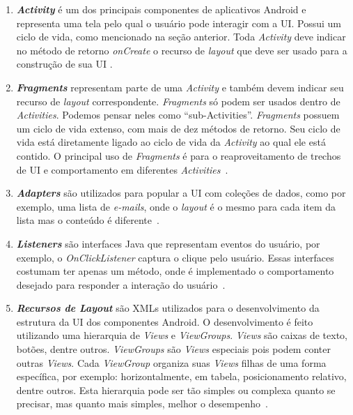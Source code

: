 \begin{enumerate}
  \item \textbf{\textit{Activity}} é um dos principais componentes de aplicativos Android e representa uma tela pelo qual o usuário pode interagir com a \acs{UI}. Possui um ciclo de vida, como mencionado na seção anterior. Toda \textit{Activity} deve indicar no método de retorno \textit{onCreate} o recurso de \textit{layout} que deve ser usado para a construção de sua \acs{UI} \cite{AndroidActivities2016, AndroidDevActivityReference}.

  \item \textbf{\textit{Fragments}} representam parte de uma \textit{Activity} e também devem indicar seu recurso de \textit{layout} correspondente. \textit{Fragments} só podem ser usados dentro de \textit{Activities}. Podemos pensar neles como ``sub-Activities''. \textit{Fragments} possuem um ciclo de vida extenso, com mais de dez métodos de retorno. Seu ciclo de vida está diretamente ligado ao ciclo de vida da \textit{Activity} ao qual ele está contido. O principal uso de \textit{Fragments} é para o reaproveitamento de trechos de \acs{UI} e comportamento em diferentes \textit{Activities}~\cite{AndroidFragments}.

  \item \textbf{\textit{Adapters}} são utilizados para popular a \acs{UI} com coleções de dados, como por exemplo, uma lista de \textit{e-mails}, onde o \textit{layout} é o mesmo para cada item da lista mas o conteúdo é diferente~\cite{AndroidLayouts}.

  \item \textbf{\textit{Listeners}} são interfaces Java que representam eventos do usuário, por exemplo, o \textit{OnClickListener} captura o clique pelo usuário. Essas interfaces costumam ter apenas um método, onde é implementado o comportamento desejado para responder a interação do usuário~\cite{AndroidUIEvents}.

  \item \textbf{\textit{Recursos de Layout}} são XMLs utilizados para o desenvolvimento da estrutura da \acs{UI} dos componentes Android. O desenvolvimento é feito utilizando uma hierarquia de \textit{Views} e \textit{ViewGroups}. \textit{Views} são caixas de texto, botões, dentre outros. \textit{ViewGroups} são \textit{Views} especiais pois podem conter outras \textit{Views}. Cada \textit{ViewGroup} organiza suas \textit{Views} filhas de uma forma específica, por exemplo: horizontalmente, em tabela, posicionamento relativo, dentre outros. Esta hierarquia pode ser tão simples ou complexa quanto se precisar, mas quanto mais simples, melhor o desempenho~\cite{AndroidLayoutResources, AndroidLayouts}.


\end{enumerate}
